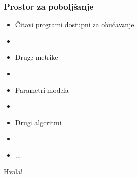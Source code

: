 \documentclass[14pt]{beamer}
\begin{document}
\begin{frame}
\frametitle{Prostor za poboljšanje}

\begin{itemize}
\item Čitavi programi dostupni za obučavanje
\item[]
\item Druge metrike
\item[]
\item Parametri modela
\item[]
\item Drugi algoritmi
\item[]
\item ...
\end{itemize}

\end{frame}


\begin{frame}
\Huge{\centerline{Hvala!}}
\end{frame}

\end{document}
